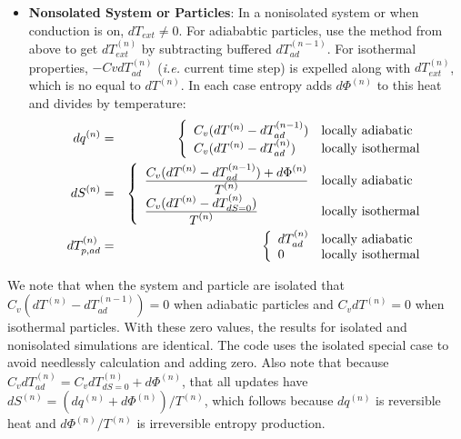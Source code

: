 \documentclass[11pt]{book}
\begin{document}
\begin{itemize}
\item {\bf Nonsolated System or Particles}:
In a nonisolated system or when conduction is on, $dT_{ext}\ne0$. For adiababtic particles, use the method from above to get $dT_{ext}^{(n)}$ by subtracting buffered $dT_{ad}^{(n-1)}$. For isothermal properties, $-CvdT_{ad}^{(n)}$ (\emph{i.e.} current time step) is expelled along with $dT_{ext}^{(n)}$, which is no equal to $dT^{(n)}$. In each case entropy adds $d\Phi^{(n)}$ to this heat and divides by temperature:
\begin{eqnarray}
           dq^{(n)} & = & \left\{ \begin{array}{ll}
                C_v(dT^{(n)}-dT_{ad}^{(n-1)}) & {\rm locally\ adiabatic} \\
                C_v(dT^{(n)}-dT_{ad}^{(n)}) & {\rm locally\ isothermal}
                \end{array} \right.\\
           dS^{(n)} & = & \left\{ \begin{array}{ll}
                {\displaystyle C_v(dT^{(n)}-dT_{ad}^{(n-1)})+d\Phi^{(n)}\over \displaystyle T^{(n)}} 
                & {\rm locally\ adiabatic} \\
                {\displaystyle C_v(dT^{(n)}-dT_{dS=0}^{(n)})\over \displaystyle T^{(n)}} & {\rm locally\ isothermal}
                \end{array} \right. \\
           dT_{p,ad}^{(n)} & = & \left\{ \begin{array}{ll}
                dT_{ad}^{(n)} & {\rm locally\ adiabatic} \\
                0 & {\rm locally\ isothermal}
                \end{array} \right.
\end{eqnarray}

\end{itemize}

We note that when the system and particle are isolated that $C_v(dT^{(n)}-dT_{ad}^{(n-1)})=0$ when adiabatic particles and $C_vdT^{(n)}=0$ when isothermal particles. With these zero values, the results for isolated and nonisolated simulations are identical. The code uses the isolated special case to avoid needlessly calculation and adding zero. Also note that because $C_vdT_{ad}^{(n)} = C_vdT_{dS=0}^{(n)}+d\Phi^{(n)}$, that all updates have $dS^{(n)} = (dq^{(n)}+d\Phi^{(n)})/T^{(n)}$, which follows because $dq^{(n)}$ is reversible heat and $d\Phi^{(n)}/T^{(n)}$ is irreversible entropy production.
\end{document}
